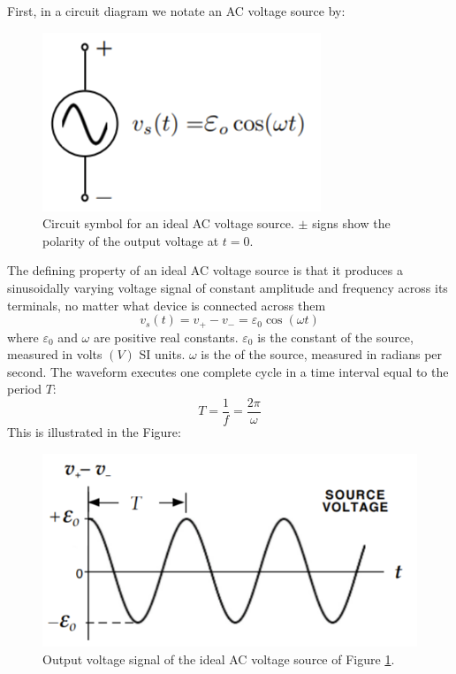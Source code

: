 First, in a circuit diagram we notate an AC voltage source by:

\begin{figure}[H]
    \centering
    \includegraphics[scale = 0.8]{Images/ACSymbol.PNG}
    \caption{Circuit symbol for an ideal AC voltage source. $\pm$ signs show the polarity of the output voltage at $t = 0$.}
    \label{fig:ACSymb}
\end{figure}

The defining property of an ideal AC voltage source is that it produces a sinusoidally varying voltage signal of constant amplitude and frequency across its terminals, no matter what device is connected across them $$v_s(t) = v_+ - v_- = \varepsilon_0\cos(\omega t)$$
where $\varepsilon_0$ and $\omega$ are positive real constants. $\varepsilon_0$ is the constant  of the source, measured in volts $(V)$ SI units. $\omega$ is the  of the source, measured in radians per second. The waveform executes one complete cycle in a time interval equal to the period $T$: $$T = \frac{1}{f} = \frac{2\pi }{\omega}$$ This is illustrated in the Figure:

\begin{figure}[H]
    \centering
    \includegraphics[scale = 0.8]{Images/ACVoltageSource.PNG}
    \caption{Output voltage signal of the ideal AC voltage source of Figure \ref{fig:ACSymb}.}
    \label{fig:ACSource}
\end{figure}

